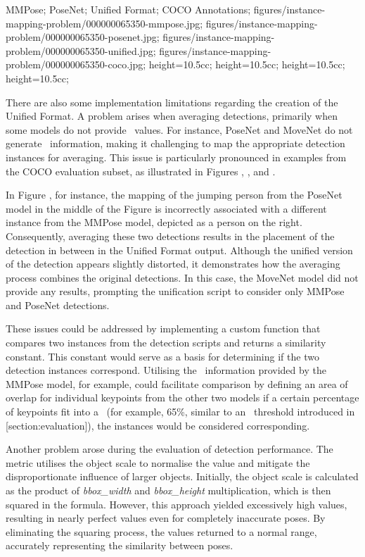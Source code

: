 {
 MMPose;
 PoseNet;
 Unified Format;
 COCO Annotations;
 }
 {
 figures/instance-mapping-problem/000000065350-mmpose.jpg;
 figures/instance-mapping-problem/000000065350-posenet.jpg;
 figures/instance-mapping-problem/000000065350-unified.jpg;
 figures/instance-mapping-problem/000000065350-coco.jpg;
 }
 {
 height=10.5cc;
 height=10.5cc;
 height=10.5cc;
 height=10.5cc;
 }

There are also some implementation limitations regarding the creation of the Unified Format. A problem arises when averaging detections, primarily when some models do not provide \BBOX\ values. For instance, PoseNet and MoveNet do not generate \BBOX\ information, making it challenging to map the appropriate detection instances for averaging. This issue is particularly pronounced in examples from the COCO evaluation subset, as illustrated in Figures , , and .

In Figure , for instance, the mapping of the jumping person from the PoseNet model in the middle of the Figure is incorrectly associated with a different instance from the MMPose model, depicted as a person on the right. Consequently, averaging these two detections results in the placement of the detection in between in the Unified Format output. Although the unified version of the detection appears slightly distorted, it demonstrates how the averaging process combines the original detections. In this case, the MoveNet model did not provide any results, prompting the unification script to consider only MMPose and PoseNet detections.

These issues could be addressed by implementing a custom function that compares two instances from the detection scripts and returns a similarity constant. This constant would serve as a basis for determining if the two detection instances correspond. Utilising the \BBOX\ information provided by the MMPose model, for example, could facilitate comparison by defining an area of overlap for individual keypoints from the other two models if a certain percentage of keypoints fit into a \BBOX\ (for example, 65\%, similar to an \IoU\ threshold introduced in [section:evaluation]), the instances would be considered corresponding.

Another problem arose during the evaluation of detection performance. The \pojem{\OKS} metric utilises the object scale to normalise the value and mitigate the disproportionate influence of larger objects. Initially, the object scale is calculated as the product of {\it bbox_width} and {\it bbox_height} multiplication, which is then squared in the \pojem{\OKS} formula. However, this approach yielded excessively high values, resulting in nearly perfect \pojem{\OKS} values even for completely inaccurate poses. By eliminating the squaring process, the \pojem{\OKS} values returned to a normal range, accurately representing the similarity between poses.

